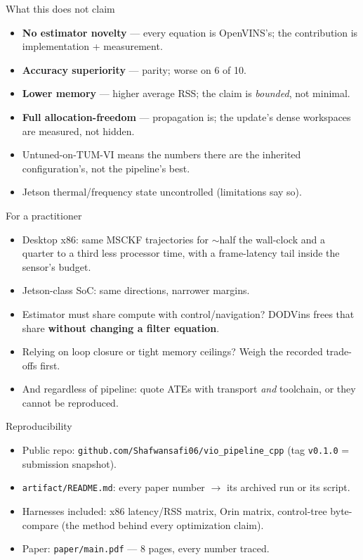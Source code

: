 \documentclass[aspectratio=169,11pt]{beamer}
\begin{document}
\begin{frame}{What this does not claim}
  \begin{itemize}
    \item \textbf{No estimator novelty} --- every equation is OpenVINS's;
          the contribution is implementation + measurement.
    \item \textbf{Accuracy superiority} --- parity; worse on 6 of 10.
    \item \textbf{Lower memory} --- higher average RSS; the claim is
          \emph{bounded}, not minimal.
    \item \textbf{Full allocation-freedom} --- propagation is; the update's
          dense workspaces are measured, not hidden.
    \item Untuned-on-TUM-VI means the numbers there are the inherited
          configuration's, not the pipeline's best.
    \item Jetson thermal/frequency state uncontrolled (limitations say so).
  \end{itemize}
\end{frame}

\begin{frame}{For a practitioner}
  \begin{itemize}
    \item Desktop x86: same MSCKF trajectories for $\sim$half the
          wall-clock and a quarter to a third less processor time, with a
          frame-latency tail inside the sensor's budget.
    \item Jetson-class SoC: same directions, narrower margins.
    \item Estimator must share compute with control/navigation? DODVins
          frees that share \textbf{without changing a filter equation}.
    \item Relying on loop closure or tight memory ceilings? Weigh the
          recorded trade-offs first.
    \item And regardless of pipeline: quote ATEs with transport
          \emph{and} toolchain, or they cannot be reproduced.
  \end{itemize}
\end{frame}

\begin{frame}{Reproducibility}
  \begin{itemize}
    \item Public repo: \texttt{github.com/Shafwansafi06/vio\_pipeline\_cpp}
          (tag \texttt{v0.1.0} = submission snapshot).
    \item \texttt{artifact/README.md}: every paper number $\rightarrow$ its
          archived run or its script.
    \item Harnesses included: x86 latency/RSS matrix, Orin matrix,
          control-tree byte-compare (the method behind every optimization
          claim).
    \item Paper: \texttt{paper/main.pdf} --- 8 pages, every number traced.
  \end{itemize}
\end{frame}
\end{document}
